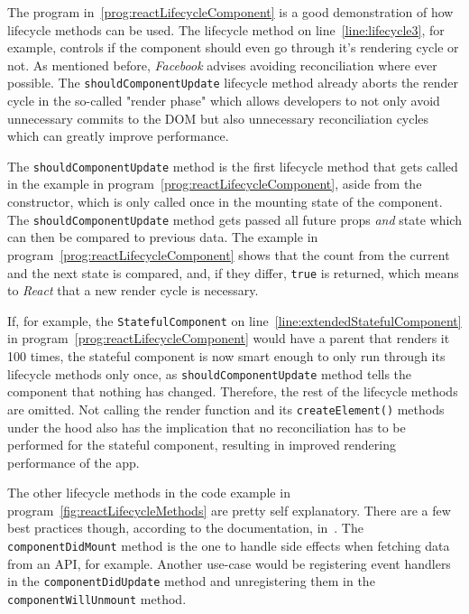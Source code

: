 The program in~\ref{prog:reactLifecycleComponent} is a good demonstration of how lifecycle methods can be used. The lifecycle method on line~\ref{line:lifecycle3}, for example, controls if the component should even go through it's rendering cycle or not. As mentioned before, \emph{Facebook} advises avoiding reconciliation where ever possible. The \texttt{shouldComponentUpdate} lifecycle method already aborts the render cycle in the so-called "render phase" which allows developers to not only avoid unnecessary commits to the DOM but also unnecessary reconciliation cycles which can greatly improve performance.

The \texttt{shouldComponentUpdate} method is the first lifecycle method that gets called in the example in program~\ref{prog:reactLifecycleComponent}, aside from the constructor, which is only called once in the mounting state of the component. The \texttt{shouldComponentUpdate} method gets passed all future props \emph{and} state which can then be compared to previous data. The example in program~\ref{prog:reactLifecycleComponent} shows that the count from the current and the next state is compared, and, if they differ, \texttt{true} is returned, which means to \emph{React} that a new render cycle is necessary.

If, for example, the \texttt{StatefulComponent} on line~\ref{line:extendedStatefulComponent} in program~\ref{prog:reactLifecycleComponent} would have a parent that renders it 100 times, the stateful component is now smart enough to only run through its lifecycle methods only once, as \texttt{shouldComponentUpdate} method tells the component that nothing has changed. Therefore, the rest of the lifecycle methods are omitted. Not calling the render function and its \texttt{createElement()} methods under the hood also has the implication that no reconciliation has to be performed for the stateful component, resulting in improved rendering performance of the app.

The other lifecycle methods in the code example in program~\ref{fig:reactLifecycleMethods} are pretty self explanatory. There are a few best practices though, according to the documentation, in~\cite{React}. The \texttt{componentDidMount} method is the one to handle side effects when fetching data from an API, for example. Another use-case would be registering event handlers in the \texttt{componentDidUpdate} method and unregistering them in the \texttt{component\linebreak[0]{}Will\linebreak[0]{}Unmount} method.

